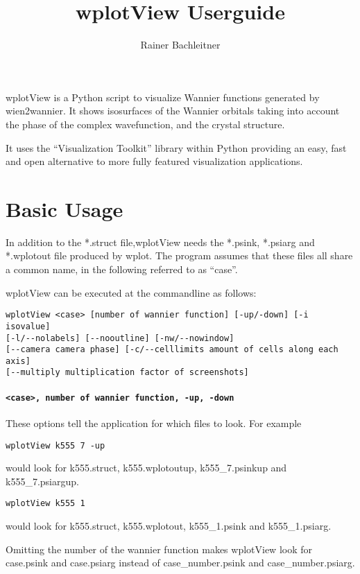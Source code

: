 \documentclass[12pt, parskip=full]{scrartcl}
\title{wplotView Userguide}
\author{Rainer Bachleitner}
\begin{document}
\maketitle

wplotView is a Python script to visualize Wannier functions generated by wien2wannier.  
It shows isosurfaces of the Wannier orbitals taking into account the phase of the complex wavefunction,
and the crystal structure.

It uses the ``Visualization Toolkit'' library within Python providing an easy, fast and open alternative to more fully featured
visualization applications.

\section{Basic Usage}

In addition to the *.struct file,wplotView needs the *.psink, *.psiarg and *.wplotout file produced by wplot. 
The program assumes that these files all share a common name, in the
following referred to as ``case''.

wplotView can be executed at the commandline as follows:
\begin{verbatim}
wplotView <case> [number of wannier function] [-up/-down] [-i isovalue] 
[-l/--nolabels] [--nooutline] [-nw/--nowindow] 
[--camera camera phase] [-c/--celllimits amount of cells along each axis]
[--multiply multiplication factor of screenshots]
\end{verbatim}

\paragraph{\texttt{<case>, number of wannier function, -up, -down}} 

These options tell the application for which files to look. For example
\begin{verbatim}
wplotView k555 7 -up 
\end{verbatim}
would look for k555.struct, k555.wplotoutup, k555\_7.psinkup and k555\_7.psiargup.
\begin{verbatim}
wplotView k555 1
\end{verbatim}
would look for k555.struct, k555.wplotout, k555\_1.psink and k555\_1.psiarg.

Omitting the number of the wannier function makes wplotView look for case.psink
and case.psiarg instead of case\_number.psink and case\_number.psiarg.
\end{document}
